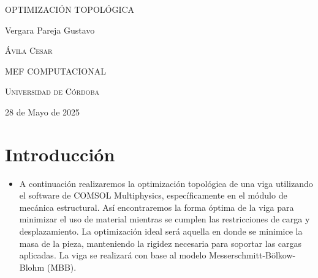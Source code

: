 \documentclass{article}
\author{Gustavo Vergara}
\theoremstyle{mytheoremstyle}
\theoremstyle{mytheoremstyle}
\theoremstyle{myproblemstyle}
\begin{document}

\begin{titlepage}
    \centering
    \vspace{2.5cm}
    {\scshape \Large OPTIMIZACIÓN TOPOLÓGICA\par}
    \vspace{5cm}
    \textbf\large\scshape{\par}
    \vspace{0.5cm}
    {\Large Vergara Pareja Gustavo\par}
    \vspace{5cm}
    {\scshape\Large Ávila Cesar\par}
    \vspace{0.3cm}
    {\scshape\Large MEF COMPUTACIONAL \par}
    \vspace{0.3cm}
    {\scshape\Large Universidad de Córdoba\par}
    \vspace{0.3cm}
    {\Large 28 de Mayo de 2025 \par}
\end{titlepage}
\tableofcontents
\newpage
\section{Introducción}
\begin{itemize}
    \item A continuación realizaremos la optimización topológica de una viga utilizando el software de COMSOL Multiphysics, específicamente en el módulo de mecánica estructural. Así encontraremos la forma óptima de la viga para minimizar el uso de material mientras se cumplen las restricciones de carga y desplazamiento. La optimización ideal será aquella en donde se minimice la masa de la pieza, manteniendo la rigidez necesaria para soportar las cargas aplicadas. La viga se realizará con base al modelo Messerschmitt-Bölkow-Blohm (MBB).
\end{itemize}
\end{document}
